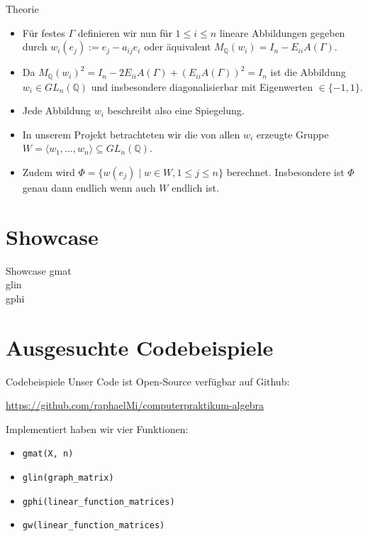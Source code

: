 \documentclass[9pt]{beamer}
\begin{document}
\begin{frame}{Theorie}
\begin{itemize}
\item Für festes $\Gamma$ definieren wir nun für $1 \leq i \leq n$ lineare Abbildungen gegeben durch $w_i(e_j) := e_j - a_{ij}e_i$ oder äquivalent $M_{\mathbb Q}(w_i) = I_n - E_{ii}A(\Gamma)$.
\item Da $M_{\mathbb Q}(w_i)^2 = I_n - 2E_{ii}A(\Gamma) + (E_{ii}A(\Gamma))^2 = I_n$ ist die Abbildung $w_i \in GL_n(\mathbb Q)$ und insbesondere diagonalisierbar mit Eigenwerten $\in \{-1,1\}$.
\item Jede Abbildung $w_i$ beschreibt also eine Spiegelung.
\item In unserem Projekt betrachteten wir die von allen $w_i$ erzeugte Gruppe $W = \langle w_1, \ldots, w_n \rangle \subseteq GL_n(\mathbb Q)$.
\item Zudem wird $\Phi = \{w(e_j) \mid w \in W, 1 \leq j \leq n\}$ berechnet. Insbesondere ist $\Phi$ genau dann endlich wenn auch $W$ endlich ist.
\end{itemize}
\end{frame}



\section{Showcase}
\begin{frame}{Showcase}
gmat\\
glin\\
gphi\\
\end{frame}
\section{Ausgesuchte Codebeispiele}
\begin{frame}{Codebeispiele}
Unser Code ist Open-Source verfügbar auf Github: \begin{center}\url{https://github.com/raphaelMi/computerpraktikum-algebra}\end{center}

Implementiert haben wir vier Funktionen:
\begin{itemize}
\item{\texttt{gmat(X, n)}}
\item{\texttt{glin(graph\_matrix)}}
\item{\texttt{gphi(linear\_function\_matrices)}}
\item{\texttt{gw(linear\_function\_matrices)}}
\end{itemize}
\end{frame}
\end{document}
